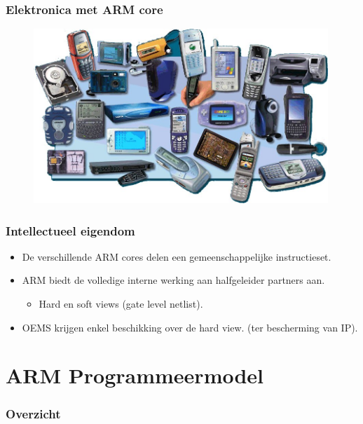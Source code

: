 \documentclass{beamer}
\begin{document}
\begin{frame} 
\frametitle{Elektronica met ARM core}
\begin{figure}[h] \begin{center}
\includegraphics[width=0.99\textwidth]{figures/armdevices.jpeg}
\end{center} \end{figure}
\end{frame}

\begin{frame} 
\frametitle{Intellectueel eigendom}
  \begin{itemize}
    \item <1-> De verschillende ARM cores delen een gemeenschappelijke instructieset.   
    \item <2-> ARM biedt de volledige interne werking aan halfgeleider partners aan.
	\begin{itemize}
	\item Hard en soft views (gate level netlist).
	\end{itemize}
    \item <3-> OEMS krijgen enkel beschikking over de hard view. (ter bescherming van IP).
  \end{itemize}

\end{frame}

\section{ARM Programmeermodel}
\begin{frame}
\frametitle{Overzicht}
\tableofcontents[sectionstyle=show/shaded,subsectionstyle=show/shaded] 
\end{frame}
\end{document}

